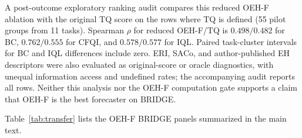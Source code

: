 A post-outcome exploratory ranking audit compares this reduced OEH-F ablation with the original TQ score on the rows where TQ is defined (55 pilot groups from 11 tasks). Spearman $\rho$ for reduced OEH-F/TQ is $0.498/0.482$ for BC, $0.762/0.555$ for CFQI, and $0.578/0.577$ for IQL. Paired task-cluster intervals for BC and IQL differences include zero. ERI, SACo, and author-published EH descriptors were also evaluated as original-score or oracle diagnostics, with unequal information access and undefined rates; the accompanying audit reports all rows. Neither this analysis nor the OEH-F computation gate supports a claim that OEH-F is the best forecaster on BRIDGE.

Table~\ref{tab:transfer} lists the OEH-F BRIDGE panels summarized in the main text.

\begin{table}[t]
\centering
\caption{Transfer to published BRIDGE MDPs: IBS change of OEH-F minus B2 (negative favors OEH-F), with descriptive task-clustered 95\% intervals. Pilots and labels were generated by the authors.}
\label{tab:transfer}
\footnotesize
\setlength{\tabcolsep}{2.5pt}
\end{table}
